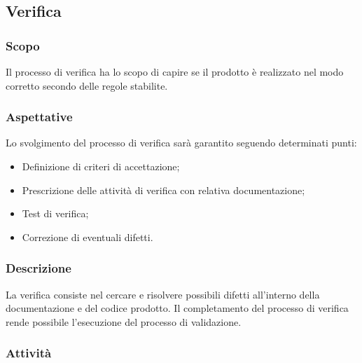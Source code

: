 \subsection{Verifica}

    \subsubsection{Scopo}
    
    Il processo di verifica ha lo scopo di capire se il prodotto è realizzato nel modo corretto secondo delle regole stabilite.
    
    \subsubsection{Aspettative}
    
    Lo svolgimento del processo di verifica sarà garantito seguendo determinati punti:
    
    \begin{itemize}
        \item Definizione di criteri di accettazione;
	\item Prescrizione delle attività di verifica con relativa documentazione;
	\item Test di verifica;
	\item Correzione di eventuali difetti.
    \end{itemize}
    
    \subsubsection{Descrizione}
		La verifica consiste nel cercare e risolvere possibili difetti all'interno della documentazione e del codice prodotto. Il completamento del processo di verifica rende possibile l'esecuzione del processo di validazione.
    \subsubsection{Attività}
